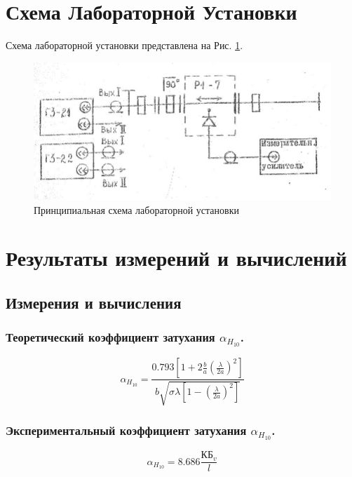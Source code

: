 \documentclass[11pt,a4paper,oneside, reqno]{amsproc}
\begin{document}
\section{Схема Лабораторной Установки}
Схема лабораторной установки представлена на Рис. \ref{fig:scheme}.
\begin{figure}[h!]
    \begin{center}
        \includegraphics[width=\textwidth]{scheme.jpg}
    \end{center}
    \vspace{-20pt}
    \caption{Принципиальная схема лабораторной установки}
    \label{fig:scheme}
\end{figure}

\newpage
\section{Результаты измерений и вычислений}
\subsection{Измерения и вычисления}
\subsubsection{Теоретический коэффициент затухания $\alpha_{H_{10}}$.}
\begin{equation}
    \alpha_{H_{10}} = \frac{0.793\left[ 1 + 2\frac{b}{a}\left( \frac{\lambda}{2a} \right)^2\right]}
                            {b\sqrt{\sigma\lambda \left[ 1 - \left( \frac{\lambda}{2a} \right)^2\right]}}
    \label{eq:alpha_teor}
\end{equation}
\vspace{10 pt}

\subsubsection{Экспериментальный коэффициент затухания $\alpha_{H_{10}}$.}
\begin{equation}
    \alpha_{H_{10}} = 8.686 \frac{КБ_v}{l}
    \label{eq:alpha_pract}
\end{equation}
\end{document}
